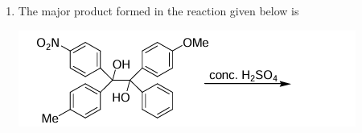 \documentclass[journal,12pt,onecolumn]{IEEEtran}
\theoremstyle{remark}
\begin{document}
\begin{enumerate}
\begin{enumerate}
        \hfill{}
    \end{enumerate}



\item The major product formed in the reaction given below is
    \begin{center}
    
        \includegraphics[width=0.5\columnwidth]{figs/q29.png}
    \end{center}
    \begin{enumerate}
        \begin{multicols}{2}
      

\end{multicols}
\end{enumerate}
\end{enumerate}
\end{document}
